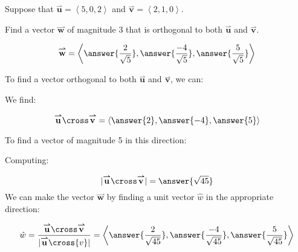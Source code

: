 \documentclass{ximera}
\author{Jim Talamo}
\begin{document}
\begin{exercise}
Suppose that $\overset{\boldsymbol{\rightharpoonup}}{\mathbf{u}} = \left< 5,0,2 \right>$ and $\overset{\boldsymbol{\rightharpoonup}}{\mathbf{v}} = \left< 2,1,0 \right>$.  

Find a vector $\overset{\boldsymbol{\rightharpoonup}}{\mathbf{w}}$ of magnitude 3 that is orthogonal to both $\overset{\boldsymbol{\rightharpoonup}}{\mathbf{u}}$ and $\overset{\boldsymbol{\rightharpoonup}}{\mathbf{v}}$.

\[
\overset{\boldsymbol{\rightharpoonup}}{\mathbf{w}} = \left< \answer{\frac{2}{\sqrt{5}}},\answer{\frac{-4}{\sqrt{5}}}, \answer{\frac{5}{\sqrt{5}}} \right>
\]


\begin{hint}
To find a vector orthogonal to both $\overset{\boldsymbol{\rightharpoonup}}{\mathbf{u}}$ and $\overset{\boldsymbol{\rightharpoonup}}{\mathbf{v}}$, we can:

\begin{multipleChoice}
\end{multipleChoice}

We find:

\[
\overset{\boldsymbol{\rightharpoonup}}{\mathbf{u}} \cross \overset{\boldsymbol{\rightharpoonup}}{\mathbf{v}} = \left< \answer{2},\answer{-4},\answer{5} \right>
\]

To find a vector of magnitude 5 in this direction:

\begin{multipleChoice}
\end{multipleChoice}

Computing:

\[
|\overset{\boldsymbol{\rightharpoonup}}{\mathbf{u}} \cross \overset{\boldsymbol{\rightharpoonup}}{\mathbf{v}} | = \answer{\sqrt{45}}
\]
We can make the vector $\overset{\boldsymbol{\rightharpoonup}}{\mathbf{w}}$ by finding a unit vector $\hat{w}$ in the appropriate direction:

\[
\hat{w} = \frac{\overset{\boldsymbol{\rightharpoonup}}{\mathbf{u}} \cross \overset{\boldsymbol{\rightharpoonup}}{\mathbf{v}}}{|\overset{\boldsymbol{\rightharpoonup}}{\mathbf{u}} \cross{v}|} = \left< \answer{\frac{2}{\sqrt{45}}},\answer{\frac{-4}{\sqrt{45}}}, \answer{\frac{5}{\sqrt{45}}} \right>
\]


\end{hint}
\end{exercise}
\end{document}

